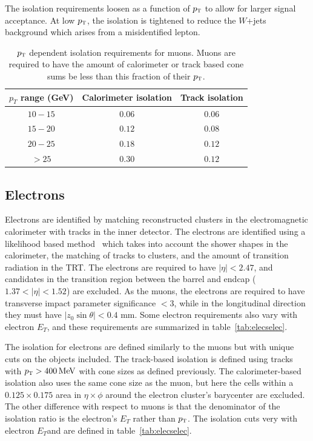 The isolation requirements loosen as a function of $p_{\textrm{\footnotesize\sc t}}$ to allow for larger signal acceptance. At low $p_{\textrm{\footnotesize\sc t}}$, the isolation is tightened to reduce the $W$+jets background which arises from a misidentified lepton. 

\begin{table}[h!]
\centering
\captionsetup{justification=centering}

\hspace{-10pt}
\begin{tabular}{|c|c|c|}
\hline
$p_T$ range (GeV) & Calorimeter isolation & Track isolation\\ \hline \hline
$10-15$ & $0.06$ & $0.06$ \\ \hline
$15-20$ & $0.12$ & $0.08$ \\ \hline
$20-25$ & $0.18$ & $0.12$ \\ \hline
$> 25$ & $0.30$ & $0.12$ \\ \hline
\end{tabular}

\caption{
$p_{\textrm{\footnotesize\sc t}}$ dependent isolation requirements for muons. Muons are required to have the amount of calorimeter or track based cone sums be less than this fraction of their $p_{\textrm{\footnotesize\sc t}}$.
}
\label{tab:muonisocuts}
\end{table}

\subsection{Electrons}

Electrons are identified by matching reconstructed clusters in the electromagnetic calorimeter with tracks in the inner detector. The electrons are identified using a likelihood based method~\cite{ElectronReco,GSF} which takes into account the shower shapes in the calorimeter, the matching of tracks to clusters, and the amount of transition radiation in the TRT. The electrons are required to have $|\eta| < 2.47$, and candidates in the transition region between the barrel and endcap ($1.37 < |\eta| < 1.52$) are excluded. As the muons, the electrons are required to have transverse impact parameter significance $ < 3$, while in the longitudinal direction they must have $|z_0 \sin \theta| < 0.4$ mm. Some electron requirements also vary with electron $E_{T}$, and these requirements are summarized in table~\ref{tab:elecselec}.

The isolation for electrons are defined similarly to the muons but with unique cuts on the objects included. The track-based isolation is defined using tracks with $\pT > 400 \MeV$ with cone sizes as defined previously. The calorimeter-based isolation also uses the same cone size as the muon, but here the cells within a $0.125 \times 0.175$ area in $\eta \times \phi$ around the electron cluster's barycenter are excluded. The other difference with respect to muons is that the denominator of the isolation ratio is the electron's $E_{T}$ rather than $p_{\textrm{\footnotesize\sc t}}$. The isolation cuts very with electron $E_{T}$and are defined in table~\ref{tab:elecselec}. 

